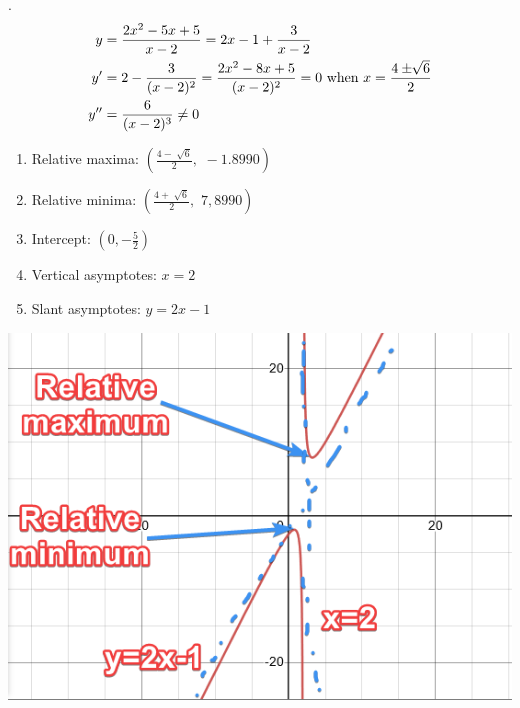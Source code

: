 \documentclass[11pt]{article}
\newcommand*{\vs}{\vspace{1cm}}
\newcommand*{\next}{\noindent}
\newcommand*{\set}{\setcounter{equation}{0}}
\begin{document}
\vs\next
16.\begin{align}
    \set
y&=\frac{2x^2-5x+5}{x-2}=2x-1+\frac{3}{x-2}\\
y'&=2-\frac{3}{(x-2)^2}=\frac{2x^2-8x+5}{(x-2)^2}=0\,\,\text{when}\,\, x=\frac{4\pm\sqrt[]{6}}{2}\\
y ''&=\frac{6}{(x-2)^3}\neq 0
\end{align}
\begin{enumerate}
    \item Relative maxima: $\left(\frac{4-\sqrt[]{6}}{2},\,\,-1.8990\right)$
    \item Relative minima: $\left(\frac{4+\sqrt[]{6}}{2},\,\,7,8990\right)$
    \item Intercept: $(0, -\frac{5}{2})$
    \item Vertical asymptotes: $x=2$
    \item Slant asymptotes: $y=2x-1$
\end{enumerate}
\includegraphics{16.png}
\end{document}
